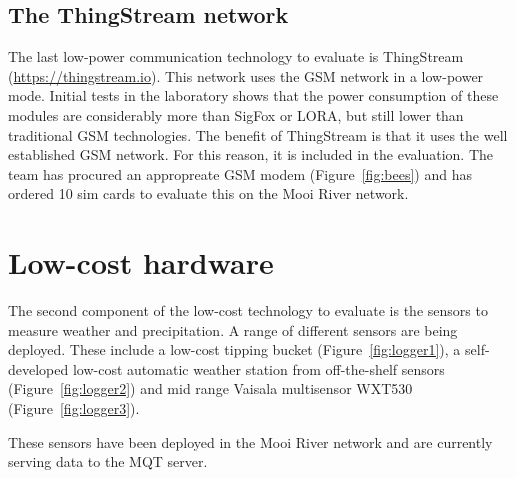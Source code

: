 \documentclass{wrcreport}
\begin{document}
\subsection{The ThingStream network}

The last low-power communication technology to evaluate is ThingStream (\url{https://thingstream.io}). This network uses the GSM network in a low-power mode. Initial tests in the laboratory shows that the power consumption of these modules are considerably more than SigFox or LORA, but still lower than traditional GSM technologies. The benefit of ThingStream is that it uses the well established GSM network. For this reason, it is included in the evaluation. The team has procured an appropreate GSM modem (Figure~\ref{fig:bees}) and has ordered 10 sim cards to evaluate this on the Mooi River network. 

\section{Low-cost hardware}

The second component of the low-cost technology to evaluate is the sensors to measure weather and precipitation. A range of different sensors are being deployed. These include a low-cost tipping bucket (Figure~\ref{fig:logger1}), a self-developed low-cost automatic weather station from off-the-shelf sensors (Figure~\ref{fig:logger2}) and mid range Vaisala multisensor WXT530 (Figure~\ref{fig:logger3}).

These sensors have been deployed in the Mooi River network and are currently serving data to the MQT server.
\end{document}
